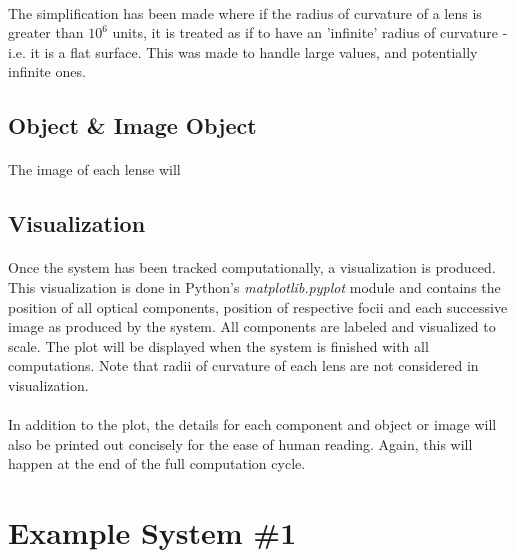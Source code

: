 \documentclass[12pt,letterpaper]{article}
\begin{document}
\paragraph*{}The simplification has been made where if the radius of curvature of a lens is greater than $10^{6}$ units, it is treated as if to have an 'infinite' radius of curvature - i.e. it is a flat surface. This was made to handle large values, and potentially infinite ones.


\subsection{Object \& Image Object}
\paragraph*{}The image of each lense will 


\subsection{Visualization}
\paragraph*{}Once the system has been tracked computationally, a visualization is produced. This visualization is done in Python's \textit{matplotlib.pyplot} module and contains the position of all optical components, position of respective focii and each successive image as produced by the system. All components are labeled and visualized to scale. The plot will be displayed when the system is finished with all computations. Note that radii of curvature of each lens are not considered in visualization.
\paragraph*{}In addition to the plot, the details for each component and object or image will also be printed out concisely for the ease of human reading. Again, this will happen at the end of the full computation cycle.

\pagebreak

\section{Example System \#1}
\end{document}
